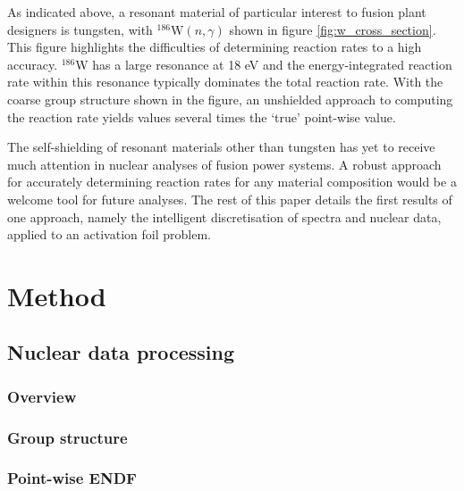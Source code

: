 As indicated above, a resonant material of particular interest to fusion plant designers is tungsten, with $^{186}\mathrm{W}(n,\gamma)$ shown in figure \ref{fig:w_cross_section}. This figure highlights the difficulties of determining reaction rates to a high accuracy. $^{186}$W has a large resonance at 18 eV and the energy-integrated reaction rate within this resonance typically dominates the total reaction rate. With the coarse group structure shown in the figure, an unshielded approach to computing the reaction rate yields values several times the `true' point-wise value.

The self-shielding of resonant materials other than tungsten has yet to receive much attention in nuclear analyses of fusion power systems. A robust approach for accurately determining reaction rates for any material composition would be a welcome tool for future analyses. The rest of this paper details the first results of one approach, namely the intelligent discretisation of spectra and nuclear data, applied to an activation foil problem.



\section{Method}
\label{sec:method}

\subsection{Nuclear data processing}
\subsubsection{Overview}

\subsubsection{Group structure}

\subsubsection{Point-wise ENDF}

